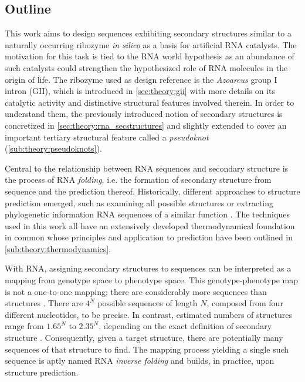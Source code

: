 \documentclass[../../master.tex]{subfiles}
\begin{document}
\subsection{Outline}
\label{sub:intro:outline}


This work aims to design sequences exhibiting secondary structures similar to a naturally occurring ribozyme \textit{in silico} as a basis for artificial RNA catalysts.
The motivation for this task is tied to the RNA world hypothesis as an abundance of such catalysts could strengthen the hypothesized role of RNA molecules in the origin of life.
The ribozyme used as design reference is the \textit{Azoarcus} group I intron (GII), which is introduced in \autoref{sec:theory:gii} with more details on its catalytic activity and distinctive structural features involved therein.
In order to understand them, the previously introduced notion of secondary structures is concretized in \autoref{sec:theory:rna_secstructures} and slightly extended to cover an important tertiary structural feature called a \emph{pseudoknot} (\autoref{sub:theory:pseudoknots}).

Central to the relationship between RNA sequences and secondary structure is the process of RNA \emph{folding}, i.e. the formation of secondary structure from sequence and the prediction thereof.
Historically, different approaches to structure prediction emerged, such as examining all possible structures or extracting phylogenetic information RNA sequences of a similar function \parencite{zuker_rna_1984}.
The techniques used in this work all have an extensively developed thermodynamical foundation in common whose principles and application to prediction have been outlined in \autoref{sub:theory:thermodynamics}.

With RNA, assigning secondary structures to sequences can be interpreted as a mapping from genotype space to phenotype space.
This genotype-phenotype map is not a one-to-one mapping; there are considerably more sequences than structures \parencite{stadler_genotype-phenotype_2006}.
There are $4^N$ possible sequences of length $N$, composed from four different nucleotides, to be precise.
In contrast, estimated numbers of structures range from $1.65^N$ to $2.35^N$, depending on the exact definition of secondary structure \parencite{stadler_genotype-phenotype_2006, haslinger_rna_1999}.
Consequently, given a target structure, there are potentially many sequences of that structure to find.
The mapping process yielding a single such sequence is aptly named RNA \emph{inverse folding} and builds, in practice, upon structure prediction.
\end{document}
